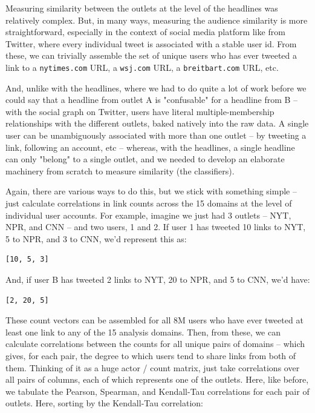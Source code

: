 \documentclass{scrartcl}
\begin{document}
Measuring similarity between the outlets at the level of the headlines was relatively complex. But, in many ways, measuring the audience similarity is more straightforward, especially in the context of social media platform like from Twitter, where every individual tweet is associated with a stable user id. From these, we can trivially assemble the set of unique users who has ever tweeted a link to a \texttt{nytimes.com} URL, a \texttt{wsj.com} URL, a \texttt{breitbart.com} URL, etc.

And, unlike with the headlines, where we had to do quite a lot of work before we could say that a headline from outlet A is "confusable" for a headline from B -- with the social graph on Twitter, users have literal multiple-membership relationships with the different outlets, baked natively into the raw data. A single user can be unambiguously associated with more than one outlet -- by tweeting a link, following an account, etc -- whereas, with the headlines, a single headline can only "belong" to a single outlet, and we needed to develop an elaborate machinery from scratch to measure similarity (the classifiers).

Again, there are various ways to do this, but we stick with something simple -- just calculate correlations in link counts across the 15 domains at the level of individual user accounts. For example, imagine we just had 3 outlets -- NYT, NPR, and CNN -- and two users, 1 and 2. If user 1 has tweeted 10 links to NYT, 5 to NPR, and 3 to CNN, we'd represent this as:

\begin{lstlisting}
[10, 5, 3]
\end{lstlisting}

And, if user B has tweeted 2 links to NYT, 20 to NPR, and 5 to CNN, we'd have:

\begin{lstlisting}
[2, 20, 5]
\end{lstlisting}

These count vectors can be assembled for all 8M users who have ever tweeted at least one link to any of the 15 analysis domains. Then, from these, we can calculate correlations between the counts for all unique pairs of domains -- which gives, for each pair, the degree to which users tend to share links from both of them. Thinking of it as a huge actor / count matrix, just take correlations over all pairs of columns, each of which represents one of the outlets. Here, like before, we tabulate the Pearson, Spearman, and Kendall-Tau correlations for each pair of outlets. Here, sorting by the Kendall-Tau correlation:
\end{document}
